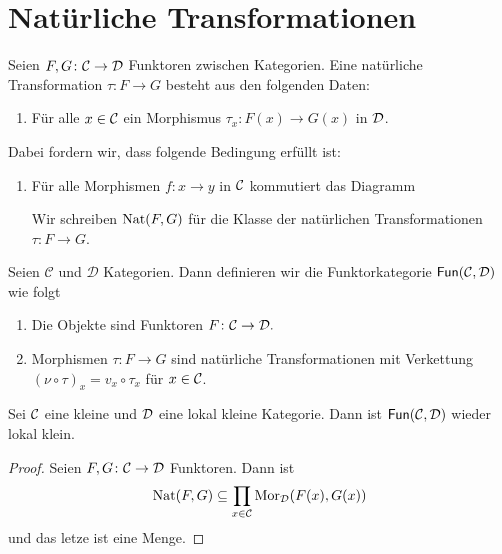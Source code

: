 \section{Natürliche Transformationen}
\begin{Def}
    Seien \(F,G\colon\mathcal{C}\to\mathcal{D}\) Funktoren zwischen Kategorien. Eine natürliche Transformation \(\tau\colon F\to G\) besteht aus den folgenden Daten:
    \begin{enumerate}
        \item Für alle \(x\in\mathcal{C}\) ein Morphismus \(\tau_x\colon F(x)\to G(x)\) in \(\mathcal{D}\).
    \end{enumerate}
\end{Def}
Dabei fordern wir, dass folgende Bedingung erfüllt ist:
\begin{enumerate}
    \item Für alle Morphismen \(f\colon x\to y\) in \(\mathcal{C}\) kommutiert das Diagramm 
 Wir schreiben \(\operatorname{Nat}(F,G)\) für die Klasse der natürlichen Transformationen \(\tau\colon F\to G\).
\end{enumerate}
\begin{Def}[Funktorkategorie]
    Seien \(\mathcal{C}\) und \(\mathcal{D}\) Kategorien. Dann definieren wir die Funktorkategorie \(\mathsf{Fun}(\mathcal{C},\mathcal{D})\) wie folgt
    \begin{enumerate}
        \item Die Objekte sind Funktoren \(F\colon \mathcal{C}\to\mathcal{D}.\)
        \item Morphismen \(\tau\colon F\to G\) sind natürliche Transformationen  mit Verkettung \((\nu\circ \tau)_x=v_x\circ\tau_x\) für \(x\in\mathcal{C}\).
    \end{enumerate}
\end{Def}
\begin{Lemma}
    Sei \(\mathcal{C}\) eine kleine und \(\mathcal{D}\) eine lokal kleine Kategorie. Dann ist \(\mathsf{Fun}(\mathcal{C},\mathcal{D})\) wieder lokal klein.
\end{Lemma}
\begin{proof}
    Seien \(F,G\colon\mathcal{C}\to\mathcal{D}\) Funktoren. Dann ist 
    \[\operatorname{Nat}(F,G)\subseteq \prod_{x\in\mathcal{C}}\operatorname{Mor}_{\mathcal{D}}(F(x),G(x))\] und das letze ist eine Menge.
\end{proof}
